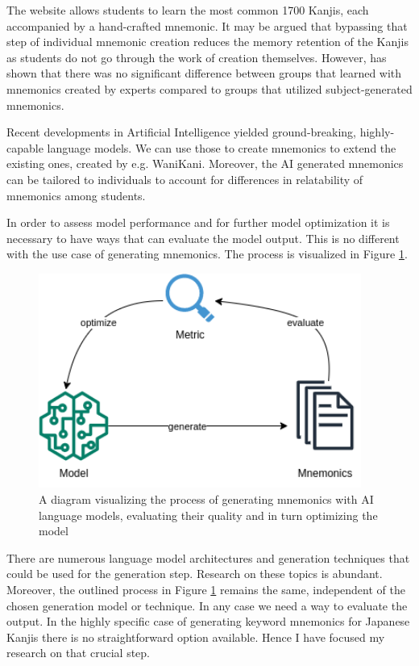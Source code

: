 The website allows students to learn the most common 1700 Kanjis, each accompanied by a hand-crafted mnemonic. It may be argued that bypassing that step of individual mnemonic creation reduces the memory retention of the Kanjis as students do not go through the work of creation themselves. However, \cite{campos_2004} has shown that there was no significant difference between groups that learned with mnemonics created by experts compared to groups that utilized subject-generated mnemonics.

Recent developments in Artificial Intelligence yielded ground-breaking, highly-capable language models. We can use those to create mnemonics to extend the existing ones, created by e.g. WaniKani. Moreover, the AI generated mnemonics can be tailored to individuals to account for differences in relatability of mnemonics among students. 

In order to assess model performance and for further model optimization it is necessary to have ways that can evaluate the model output. This is no different with the use case of generating mnemonics. The process is visualized in Figure \ref{figure:overall_process}.
\begin{figure}
    \centering
    \includegraphics[width=300pt]{resources/general.png}
    \caption{A diagram visualizing the process of generating mnemonics with AI language models, evaluating their quality and in turn optimizing the model}
    \label{figure:overall_process}
\end{figure}


There are numerous language model architectures and generation techniques that could be used for the generation step. Research on these topics is abundant. Moreover, the outlined process in Figure \ref{figure:overall_process} remains the same, independent of the chosen generation model or technique. In any case we need a way to evaluate the output. In the highly specific case of generating keyword mnemonics for Japanese Kanjis there is no straightforward option available. Hence I have focused my research on that crucial step.  

